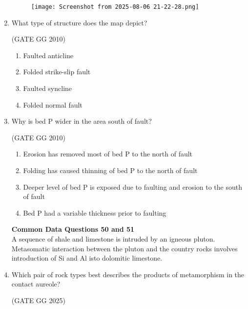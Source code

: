 \documentclass[journal]{IEEEtran}
\begin{document}
\begin{enumerate}[start=1]
\begin{figure}[H]
    \centering
    \texttt{[image: Screenshot from 2025-08-06 21-22-28.png]}
    \caption{}
    \label{fig:}
\end{figure}
\item What type of structure does the map depict?

\hfill{(GATE GG 2010)}

\begin{enumerate}
    \item Faulted anticline
    \item Folded strike-slip fault
    \item Faulted syncline
    \item Folded normal fault
\end{enumerate}

\item Why is bed P wider in the area south of fault?

\hfill{(GATE GG 2010)}

\begin{enumerate}
    \item Erosion has removed most of bed P to the north of fault
    \item Folding has caused thinning of bed P to the north of fault
    \item Deeper level of bed P is exposed due to faulting and erosion to the south of fault
    \item Bed P had a variable thickness prior to faulting
\end{enumerate}

\textbf{Common Data Questions 50 and 51}\\
A sequence of shale and limestone is intruded by an igneous pluton. Metasomatic interaction between the pluton and the country rocks involves introduction of Si and Al isto dolomitic limestone.
\vspace{0.6cm}
\item  Which pair of rock types best describes the products of metamorphism in the contact aureole?

\hfill{(GATE GG 2025)}

\begin{enumerate}
\end{enumerate}


\end{enumerate}
\end{document}
